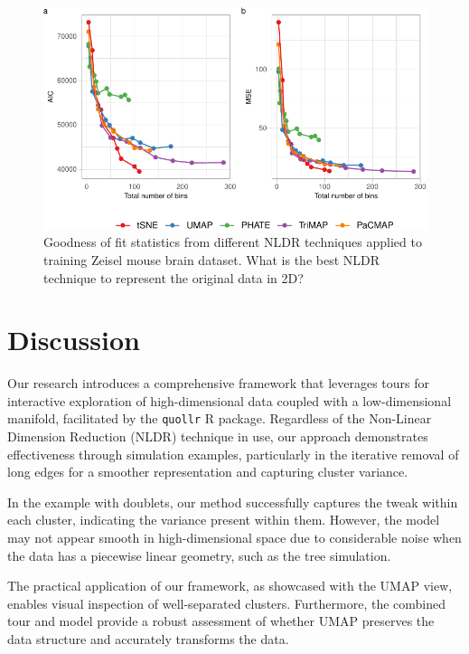 \documentclass[
  12pt]{article}
\begin{document}
\begin{figure}

{\centering \includegraphics[width=1\textwidth,height=\textheight]{paper_files/figure-pdf/fig-diagnosticpltZEI-1.pdf}

}

\caption{\label{fig-diagnosticpltZEI}Goodness of fit statistics from
different NLDR techniques applied to training Zeisel mouse brain
dataset. What is the best NLDR technique to represent the original data
in 2D?}

\end{figure}

\hypertarget{sec-discussion}{%
\section{Discussion}\label{sec-discussion}}

Our research introduces a comprehensive framework that leverages tours
for interactive exploration of high-dimensional data coupled with a
low-dimensional manifold, facilitated by the \texttt{quollr} R package.
Regardless of the Non-Linear Dimension Reduction (NLDR) technique in
use, our approach demonstrates effectiveness through simulation
examples, particularly in the iterative removal of long edges for a
smoother representation and capturing cluster variance.

In the example with doublets, our method successfully captures the tweak
within each cluster, indicating the variance present within them.
However, the model may not appear smooth in high-dimensional space due
to considerable noise when the data has a piecewise linear geometry,
such as the tree simulation.

The practical application of our framework, as showcased with the UMAP
view, enables visual inspection of well-separated clusters. Furthermore,
the combined tour and model provide a robust assessment of whether UMAP
preserves the data structure and accurately transforms the data.
\end{document}
